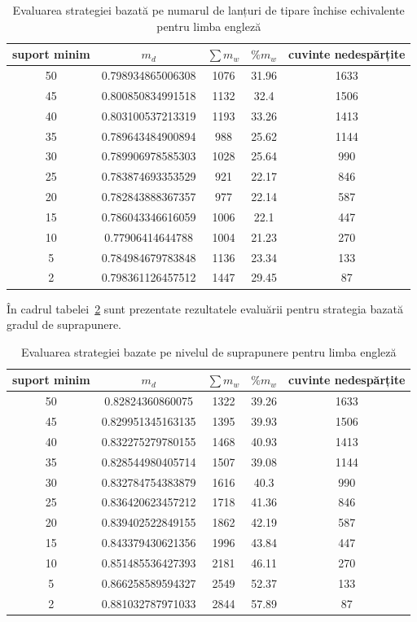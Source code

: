 \begin{table}[h!]
\centering
\begin{tabular}{|c|c|c|c|c|}
\hline
suport minim & $m_d$ & $\sum m_w$ & $\%{m_w}$ & cuvinte nedespărțite\\ 
\hline
\hline
50 & 0.798934865006308 & 1076 & 31.96 & 1633\\ 
\hline
45 & 0.800850834991518 & 1132 & 32.4 & 1506\\ 
\hline
40 & 0.803100537213319 & 1193 & 33.26 & 1413\\ 
\hline
35 & 0.789643484900894 & 988 & 25.62 & 1144\\ 
\hline
30 & 0.789906978585303 & 1028 & 25.64 & 990\\ 
\hline
25 & 0.783874693353529 & 921 & 22.17 & 846\\ 
\hline
20 & 0.782843888367357 & 977 & 22.14 & 587\\ 
\hline
15 & 0.786043346616059 & 1006 & 22.1 & 447\\ 
\hline
10 & 0.77906414644788 & 1004 & 21.23 & 270\\ 
\hline
5 & 0.784984679783848 & 1136 & 23.34 & 133\\ 
\hline
2 & 0.798361126457512 & 1447 & 29.45 & 87\\ 
\hline\end{tabular}
\caption{Evaluarea strategiei bazată pe numarul de lanțuri de tipare închise echivalente pentru limba engleză} 
\label{table:counting_en}
\end{table}

În cadrul tabelei~\ref{table:overlapping_en} sunt prezentate rezultatele evaluării pentru strategia bazată gradul de suprapunere.

\begin{table}[h!]
\centering
\begin{tabular}{|c|c|c|c|c|}
\hline
suport minim & $m_d$ & $\sum m_w$ & $\%{m_w}$ & cuvinte nedespărțite\\ 
\hline
\hline
50 & 0.82824360860075 & 1322 & 39.26 & 1633\\ 
\hline
45 & 0.829951345163135 & 1395 & 39.93 & 1506\\ 
\hline
40 & 0.832275279780155 & 1468 & 40.93 & 1413\\ 
\hline
35 & 0.828544980405714 & 1507 & 39.08 & 1144\\ 
\hline
30 & 0.832784754383879 & 1616 & 40.3 & 990\\ 
\hline
25 & 0.836420623457212 & 1718 & 41.36 & 846\\ 
\hline
20 & 0.839402522849155 & 1862 & 42.19 & 587\\ 
\hline
15 & 0.843379430621356 & 1996 & 43.84 & 447\\ 
\hline
10 & 0.851485536427393 & 2181 & 46.11 & 270\\ 
\hline
5 & 0.866258589594327 & 2549 & 52.37 & 133\\ 
\hline
2 & 0.881032787971033 & 2844 & 57.89 & 87\\ 
\hline\end{tabular}
\caption{Evaluarea strategiei bazate pe nivelul de suprapunere pentru limba engleză} 
\label{table:overlapping_en}
\end{table}

